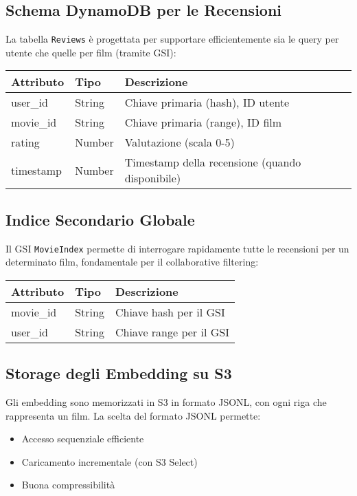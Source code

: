 \documentclass[11pt,a4paper]{article}
\begin{document}
\subsection{Schema DynamoDB per le Recensioni}
La tabella \texttt{Reviews} è progettata per supportare efficientemente sia le query per utente che quelle per film (tramite GSI):

\begin{center}
\begin{tabular}{lll}
\toprule
\textbf{Attributo} & \textbf{Tipo} & \textbf{Descrizione} \\
\midrule
user\_id & String & Chiave primaria (hash), ID utente \\
movie\_id & String & Chiave primaria (range), ID film \\
rating & Number & Valutazione (scala 0-5) \\
timestamp & Number & Timestamp della recensione (quando disponibile) \\
\bottomrule
\end{tabular}
\end{center}

\subsection{Indice Secondario Globale}
Il GSI \texttt{MovieIndex} permette di interrogare rapidamente tutte le recensioni per un determinato film, fondamentale per il collaborative filtering:

\begin{center}
\begin{tabular}{lll}
\toprule
\textbf{Attributo} & \textbf{Tipo} & \textbf{Descrizione} \\
\midrule
movie\_id & String & Chiave hash per il GSI \\
user\_id & String & Chiave range per il GSI \\
\bottomrule
\end{tabular}
\end{center}

\subsection{Storage degli Embedding su S3}
Gli embedding sono memorizzati in S3 in formato JSONL, con ogni riga che rappresenta un film. La scelta del formato JSONL permette:

\begin{itemize}
  \item Accesso sequenziale efficiente
  \item Caricamento incrementale (con S3 Select)
  \item Buona compressibilità
\end{itemize}
\end{document}
